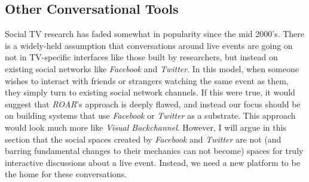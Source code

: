% 	
% 	
% 
% 
% 
% 
% 
% 
% 
% 








\subsection{Other Conversational Tools}

Social TV research has faded somewhat in popularity since the mid 2000's.  There is a widely-held assumption that conversations around live events are going on not in TV-specific interfaces like those built by researchers, but instead on existing social networks like \emph{Facebook} and \emph{Twitter}. In this model, when someone wishes to interact with friends or strangers watching the same event as them, they simply turn to existing social network channels. If this were true, it would suggest that \emph{ROAR}'s approach is deeply flawed, and instead our focus should be on building systems that use \emph{Facebook} or \emph{Twitter} as a substrate. This approach would look much more like \emph{Visual Backchannel}\citep{Dork:2010fb}. However, I will argue in this section that the social spaces created by \emph{Facebook} and \emph{Twitter} are not (and barring fundamental changes to their mechanics can not become) spaces for truly interactive discussions about a live event. Instead, we need a new platform to be the home for these conversations.

